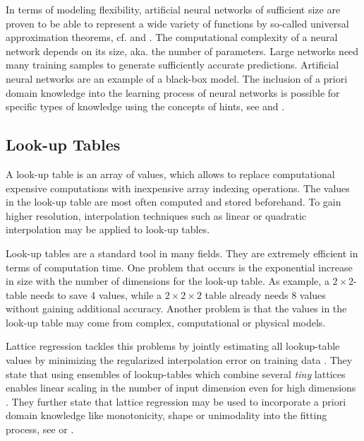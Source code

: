 In terms of modeling flexibility, artificial neural networks of sufficient size are proven to be able to represent a wide variety of functions by so-called universal approximation theorems, cf. \cite{cybenko1989approximation} and \cite{hornik1991approximation}. The computational complexity of a neural network depends on its size, aka. the number of parameters. Large networks need many training samples to generate sufficiently accurate predictions. Artificial neural networks are an example of a black-box model. The inclusion of a priori domain knowledge into the learning process of neural networks is possible for specific types of knowledge using the concepts of hints, see \cite{abu1990learning} and \cite{sill1997monotonicity}.

\subsection{Look-up Tables}

A look-up table is an array of values, which allows to replace computational expensive computations with inexpensive array indexing operations. The values in the look-up table are most often computed and stored beforehand. To gain higher resolution, interpolation techniques such as linear or quadratic interpolation may be applied to look-up tables. 

Look-up tables are a standard tool in many fields. They are extremely efficient in terms of computation time. One problem that occurs is the exponential increase in size with the number of dimensions for the look-up table. As example, a $2 \times 2$-table needs to save 4 values, while a $2 \times 2 \times 2$ table already needs 8 values without gaining additional accuracy. Another problem is that the values in the look-up table may come from complex, computational or physical models. 

Lattice regression tackles this problems by jointly estimating all lookup-table values by minimizing the regularized interpolation error on training data \cite{garcia2009lattice}. They state that using ensembles of lookup-tables which combine several \emph{tiny} lattices enables linear scaling in the number of input dimension even for high dimensions \cite{fard2016fast}. They further state that lattice regression may be used to incorporate a priori domain knowledge like monotonicity, shape or unimodality into the fitting process, see \cite{gupta2016monotonic} or \cite{you2017deep}.

